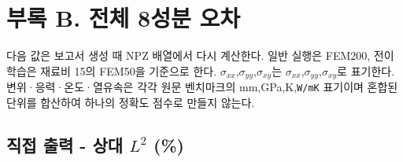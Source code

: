 \documentclass[10pt,a4paper]{article}
\renewcommand{\arraystretch}{1.25}
\begin{document}
\clearpage

\section{부록 B. 전체 8성분 오차}

다음 값은 보고서 생성 때 NPZ 배열에서 다시 계산한다. 일반 실행은 FEM200, 전이학습은 재료비 15의 FEM50을 기준으로 한다. $\sigma_{xx}$,$\sigma_{yy}$,$\sigma_{xy}$는 $\sigma_{xx}$,$\sigma_{yy}$,$\sigma_{xy}$로 표기한다. 변위·응력·온도·열유속은 각각 원문 벤치마크의 mm,GPa,K,\nolinkurl{W/mK} 표기이며 혼합된 단위를 합산하여 하나의 정확도 점수로 만들지 않는다.\par

\subsection{직접 출력 - 상대 $L^2$ (\%)}

\begingroup\fontsize{8}{10.5}\selectfont\renewcommand{\arraystretch}{1.1}
\end{document}
